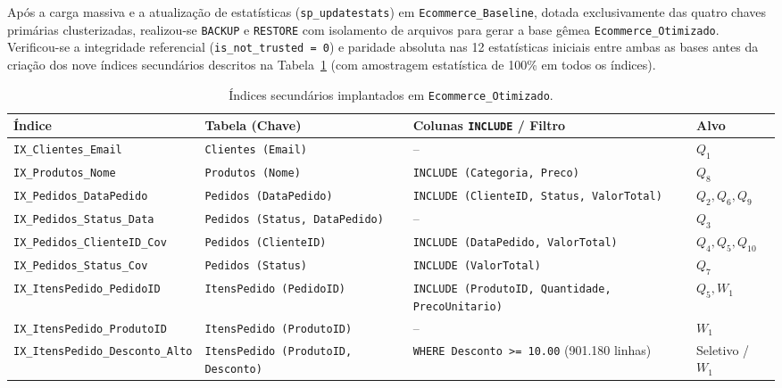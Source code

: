 \documentclass[12pt]{article}
\begin{document}
Após a carga massiva e a atualização de estatísticas (\texttt{sp\_updatestats}) em \texttt{Ecommerce\_Baseline}, dotada exclusivamente das quatro chaves primárias clusterizadas, realizou-se \texttt{BACKUP} e \texttt{RESTORE} com isolamento de arquivos para gerar a base gêmea \texttt{Ecommerce\_Otimizado}. Verificou-se a integridade referencial (\texttt{is\_not\_trusted = 0}) e paridade absoluta nas 12 estatísticas iniciais entre ambas as bases antes da criação dos nove índices secundários descritos na Tabela~\ref{tab:indices} (com amostragem estatística de 100\% em todos os índices).

\begin{table}[htbp]
\centering
\caption{Índices secundários implantados em \texttt{Ecommerce\_Otimizado}.}
\label{tab:indices}
\scriptsize
\setlength{\tabcolsep}{3pt}
\begin{tabular}{@{}lp{3.5cm}p{4.2cm}l@{}}
\toprule
\textbf{Índice} & \textbf{Tabela (Chave)} & \textbf{Colunas \texttt{INCLUDE} / Filtro} & \textbf{Alvo} \\
\midrule
\texttt{IX\_Clientes\_Email} & \texttt{Clientes (Email)} & -- & $Q_1$ \\
\texttt{IX\_Produtos\_Nome} & \texttt{Produtos (Nome)} & \texttt{INCLUDE (Categoria, Preco)} & $Q_8$ \\
\texttt{IX\_Pedidos\_DataPedido} & \texttt{Pedidos (DataPedido)} & \texttt{INCLUDE (ClienteID, Status, ValorTotal)} & $Q_2, Q_6, Q_9$ \\
\texttt{IX\_Pedidos\_Status\_Data} & \texttt{Pedidos (Status, DataPedido)} & -- & $Q_3$ \\
\texttt{IX\_Pedidos\_ClienteID\_Cov} & \texttt{Pedidos (ClienteID)} & \texttt{INCLUDE (DataPedido, ValorTotal)} & $Q_4, Q_5, Q_{10}$ \\
\texttt{IX\_Pedidos\_Status\_Cov} & \texttt{Pedidos (Status)} & \texttt{INCLUDE (ValorTotal)} & $Q_7$ \\
\texttt{IX\_ItensPedido\_PedidoID} & \texttt{ItensPedido (PedidoID)} & \texttt{INCLUDE (ProdutoID, Quantidade, PrecoUnitario)} & $Q_5, W_1$ \\
\texttt{IX\_ItensPedido\_ProdutoID} & \texttt{ItensPedido (ProdutoID)} & -- & $W_1$ \\
\texttt{IX\_ItensPedido\_Desconto\_Alto} & \texttt{ItensPedido (ProdutoID, Desconto)} & \texttt{WHERE Desconto >= 10.00} (901.180 linhas) & Seletivo / $W_1$ \\
\bottomrule
\end{tabular}
\end{table}
\end{document}

